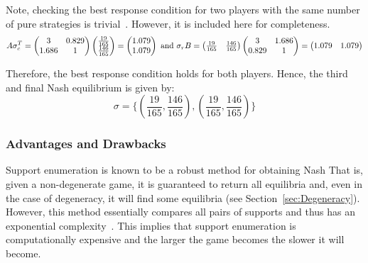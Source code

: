 Note, checking the best response condition for two players with the same number
of pure strategies is trivial~\cite{Knight2019b}. However, it is included here for completeness.
\begin{displaymath}
    A\sigma_{c}^{T} = \begin{pmatrix}
        3 & 0.829 \\
        1.686 & 1 \\
    \end{pmatrix} \begin{pmatrix}
        \frac{19}{165} \\
        \frac{146}{165} \\
    \end{pmatrix} = \begin{pmatrix}
        1.079 \\
        1.079 \\
    \end{pmatrix} \text{   and   } \\
    \sigma_{r}B = \begin{pmatrix}
        \frac{19}{165} & \frac{146}{165} \\
    \end{pmatrix} \begin{pmatrix}
        3 & 1.686 \\
        0.829 & 1 \\
    \end{pmatrix} = \begin{pmatrix}
        1.079 & 1.079
    \end{pmatrix}
\end{displaymath}

Therefore, the best response condition holds for both players. Hence, the third and final Nash equilibrium is given by:
\begin{displaymath}
    \sigma = \{(\frac{19}{165}, \frac{146}{165}), (\frac{19}{165}, \frac{146}{165})\}
\end{displaymath}


\subsubsection{Advantages and Drawbacks}\label{subsubsec:Adv_and_Drawbacks}
Support enumeration is known to be a robust method for obtaining Nash
That is, given a non-degenerate game,
it is guaranteed to return all equilibria and, even in the case of degeneracy,
it will find some equilibria (see Section~\ref{sec:Degeneracy}). However, this method essentially
compares all pairs of supports and thus has an exponential complexity~\cite{Rampersaud2014}. This implies that support enumeration is
computationally expensive and the larger the game becomes the slower it will become.


